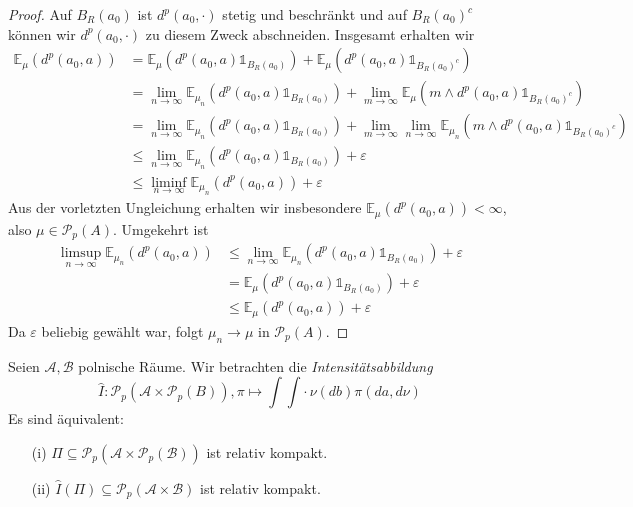 \begin{proof}
    Auf $B_R(a_0)$ ist $d^p(a_0, \cdot)$ stetig und beschränkt und auf $B_R(a_0)^c$ können wir $d^p(a_0, \cdot)$ zu diesem Zweck abschneiden. Insgesamt erhalten wir
    \begin{align*}
        \mathbb{E}_\mu(d^p(a_0, a)) &= \mathbb{E}_\mu(d^p(a_0, a)\mathds{1}_{B_R(a_0)}) + \mathbb{E}_\mu(d^p(a_0, a) \mathds{1}_{B_R(a_0)^c}) \\
        &= \lim_{n\rightarrow \infty} \mathbb{E}_{\mu_n}(d^p(a_0, a) \mathds{1}_{B_R(a_0)}) + \lim_{m\rightarrow\infty}\mathbb{E}_{\mu}(m\wedge d^p(a_0, a) \mathds{1}_{B_R(a_0)^c}) \\
        &= \lim_{n\rightarrow\infty} \mathbb{E}_{\mu_n}(d^p(a_0, a) \mathds{1}_{B_R(a_0)}) + \lim_{m\rightarrow \infty}\lim_{n\rightarrow\infty} \mathbb{E}_{\mu_n}(m\wedge d^p(a_0, a) \mathds{1}_{B_R(a_0)^c}) \\
        &\leq \lim_{n\rightarrow\infty}\mathbb{E}_{\mu_n}(d^p(a_0, a)\mathds{1}_{B_R(a_0)}) + \varepsilon \\
        &\leq \liminf_{n\rightarrow\infty} \mathbb{E}_{\mu_n}(d^p(a_0, a)) + \varepsilon
    \end{align*}
    Aus der vorletzten Ungleichung erhalten wir insbesondere $\mathbb{E}_{\mu}(d^p(a_0, a)) < \infty$, also $\mu \in \mathcal{P}_p(A)$. Umgekehrt ist 
    \begin{align*}
        \limsup_{n\rightarrow\infty}\mathbb{E}_{\mu_n}(d^p(a_0, a)) &\leq \lim_{n\rightarrow\infty} \mathbb{E}_{\mu_n}(d^p(a_0, a) \mathds{1}_{B_R(a_0)}) + \varepsilon \\
        &= \mathbb{E}_{\mu}(d^p(a_0, a)\mathds{1}_{B_R(a_0)}) + \varepsilon \\
        &\leq \mathbb{E}_{\mu}(d^p(a_0, a)) + \varepsilon
    \end{align*}
    Da $\varepsilon$ beliebig gewählt war, folgt $\mu_n \rightarrow \mu$ in $\mathcal{P}_p(A)$.
\end{proof}
\begin{lemma}\label{thm:intensity_compactness}
    Seien $\mathcal{A,B}$ polnische Räume. Wir betrachten die \emph{Intensitätsabbildung} 
    $$\hat{I}: \mathcal{P}_p(\mathcal{A} \times \mathcal{P}_p(B)), \pi \mapsto \int \int \cdot \,\nu(db) \pi(da, d\nu)$$
    Es sind äquivalent:
    \begin{enumerate}
        \item[(i)] $\Pi \subseteq \mathcal{P}_p(\mathcal{A}\times \mathcal{P}_p(\mathcal{B}))$ ist relativ kompakt.
        \item[(ii)] $\hat{I}(\Pi) \subseteq \mathcal{P}_p(\mathcal{A} \times \mathcal{B})$ ist relativ kompakt.
    \end{enumerate}
\end{lemma}
